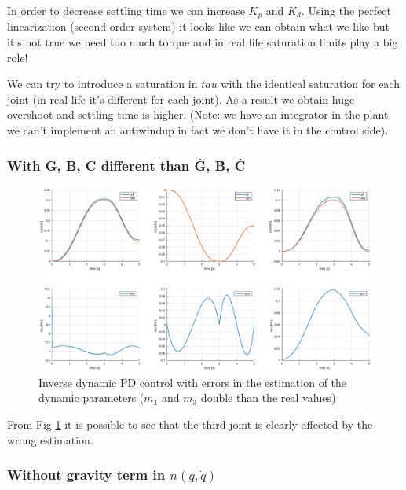 \documentclass[a4paper,12pt]{article}
\begin{document}
In order to decrease settling time we can increase $K_p$ and $K_d$. Using the perfect linearization (second order system) it looks like we can obtain what we like but it's not true we need too much torque and in real life saturation limits play a big role!

We can try to introduce a saturation in $tau$ with the identical saturation for each joint (in real life it's different for each joint). As a result we obtain huge overshoot and settling time is higher. (Note: we have an integrator in the plant we can't implement an antiwindup in fact we don't have it in the control side).

\subsubsection{With G, B, C different than \^{G}, \^{B}, \^{C}}

\begin{figure}[H]
    \begin{center}
        \hspace*{-4.5cm}
        \includegraphics[scale=0.5]{images/inv_dyn_app.eps}
    \end{center}
    \caption{Inverse dynamic PD control with errors in the estimation of the dynamic parameters ($m_1$ and $m_3$ double than the real values)}
    \label{fig:inv_dyn_app}
\end{figure}

From Fig \ref{fig:inv_dyn_app} it is possible to see that the third joint is clearly affected by the wrong estimation. 

\subsubsection{Without gravity term in $n(q,\dot{q})$}
\end{document}
